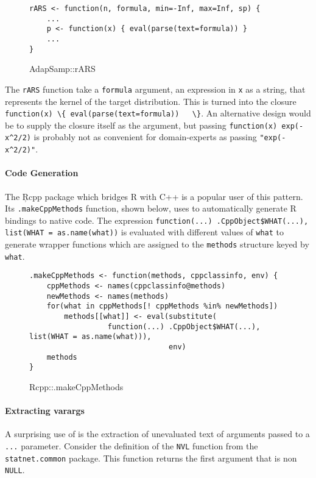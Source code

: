 \documentclass[screen,acmsmall]{acmart}%
\newcommand{\code}[1]{\lstinline |#1|\xspace}
\begin{document}
\begin{figure}[h]
\begin{lstlisting}
rARS <- function(n, formula, min=-Inf, max=Inf, sp) {
    ...
    p <- function(x) { eval(parse(text=formula)) }
    ...
}
\end{lstlisting}
  \caption{AdapSamp::rARS}
\end{figure}

The \code{rARS} function take a \code{formula} argument, an expression in
\code{x} as a string, that represents the kernel of the target distribution.
This is turned into the closure \code{function(x) \{ eval(parse(text=formula))
  \}}. An alternative design would be to supply the closure itself as the
argument, but passing \code{function(x) exp(-x^2/2)} is probably not as
convenient for domain-experts as passing \code{"exp(-x^2/2)"}.

\paragraph{Code Generation} The \c{Rcpp} package which bridges R with C++ is a
popular user of this pattern. Its \code{.makeCppMethods} function, shown below,
uses \eval to automatically generate R bindings to native code. The expression
\code{function(...) .CppObject$WHAT(...), list(WHAT = as.name(what))} is
evaluated with different values of \code{what} to generate wrapper functions
which are assigned to the \code{methods} structure keyed by \code{what}.

\begin{figure}[h]
\begin{lstlisting}
.makeCppMethods <- function(methods, cppclassinfo, env) {
    cppMethods <- names(cppclassinfo@methods)
    newMethods <- names(methods)
    for(what in cppMethods[! cppMethods %in% newMethods])
        methods[[what]] <- eval(substitute(
                  function(...) .CppObject$WHAT(...), list(WHAT = as.name(what))),
                                env)
    methods
}
\end{lstlisting}
  \caption{Rcpp::.makeCppMethods}
\end{figure}

\paragraph{Extracting varargs} A surprising use of \eval is the
extraction of unevaluated text of arguments passed to a \code{...} parameter.
Consider the definition of the \code{NVL} function from the
\code{statnet.common} package. This function returns the first argument that is
non \code{NULL}.
\end{document}
